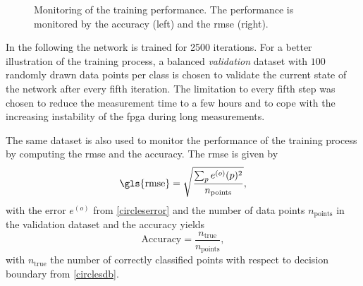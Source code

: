 \begin{figure}
	\begin{center}
		
	\end{center}
	\caption[Monitoring of the training performance.]{Monitoring of the training performance. The performance is monitored by the accuracy (left) and the \acrfull{rmse} (right).}
	\label{circles_acc}
\end{figure}

In the following the network is trained for 2500 iterations. For a better illustration of the training process, a balanced \emph{validation} dataset with $100$ randomly drawn data points per class is chosen to validate the current state of the network after every fifth iteration. The limitation to every fifth step was chosen to reduce the measurement time to a few hours and to cope with the increasing instability of the \gls{fpga} during long measurements.

The same dataset is also used to monitor the performance of the training process by computing the \gls{rmse} and the accuracy. The \gls{rmse} is given by
\begin{equation}
\text{\gls{rmse}} = \sqrt{\frac{\sum_p e^{(o)}(p)^2}{n_\text{points}}},
\end{equation}
with the error $e^{(o)}$ from \cref{circleserror} and the number of data points $n_\text{points}$ in the validation dataset and the accuracy yields
\begin{equation}
\text{Accuracy} = \frac{n_\text{true}}{n_\text{points}},
\end{equation}
with $n_\text{true}$ the number of correctly classified points with respect to decision boundary from \cref{circlesdb}.

%	

